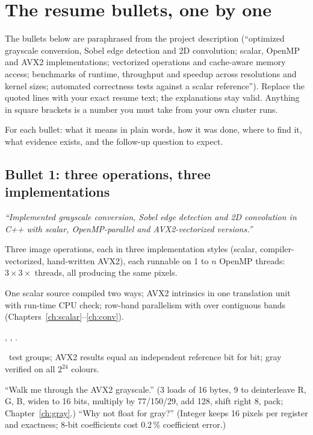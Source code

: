 \chapter{The resume bullets, one by one}\label{ch:resume}

\begin{warn}[Wording]
The bullets below are paraphrased from the project description (``optimized grayscale conversion, Sobel edge detection and 2D convolution; scalar, OpenMP and AVX2 implementations; vectorized operations and cache-aware memory access; benchmarks of runtime, throughput and speedup across resolutions and kernel sizes; automated correctness tests against a scalar reference''). Replace the quoted lines with your exact resume text; the explanations stay valid. Anything in square brackets is a number you must take from your own cluster runs.
\end{warn}

For each bullet: what it means in plain words, how it was done, where to find it, what evidence exists, and the follow-up question to expect.

\section{Bullet 1: three operations, three implementations}
\textit{``Implemented grayscale conversion, Sobel edge detection and 2D convolution in C++ with scalar, OpenMP-parallel and AVX2-vectorized versions.''}

\begin{description}[leftmargin=2.2cm,style=nextline]
\item[What] Three image operations, each in three implementation styles (scalar, compiler-vectorized, hand-written AVX2), each runnable on 1 to $n$ OpenMP threads: $3\times3\times$ threads, all producing the same pixels.
\item[How] One scalar source compiled two ways; AVX2 intrinsics in one translation unit with run-time CPU check; row-band parallelism with  over contiguous bands (Chapters~\ref{ch:scalar}--\ref{ch:conv}).
\item[Where] , , .
\item[Evidence] \testGroups\ test groups; AVX2 results equal an independent  reference bit for bit; gray verified on all $2^{24}$ colours.
\item[Expect] ``Walk me through the AVX2 grayscale.'' (3 loads of 16 bytes, 9  to deinterleave R, G, B, widen to 16 bits, multiply by 77/150/29, add 128, shift right 8, pack; Chapter~\ref{ch:gray}.) ``Why not float for gray?'' (Integer keeps 16 pixels per register and exactness; 8-bit coefficients cost 0.2\,\% coefficient error.)
\end{description}

